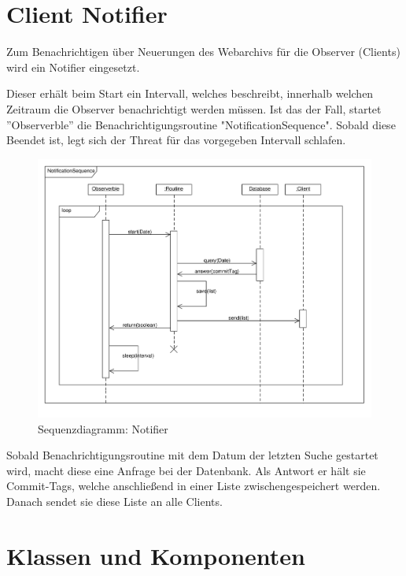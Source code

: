 \section {Client Notifier}
Zum Benachrichtigen über Neuerungen des Webarchivs für die Observer (Clients) wird ein Notifier eingesetzt.

Dieser erhält beim Start ein Intervall, welches beschreibt, innerhalb welchen Zeitraum die Observer  benachrichtigt werden müssen. Ist das der Fall, startet ''Observerble'' die Benachrichtigungsroutine  "NotificationSequence". Sobald diese Beendet ist, legt sich der Threat  für das vorgegeben Intervall schlafen.

\begin{figure}[H]
	\centering
	\includegraphics[width=\textwidth]{design/frontend/sequence/notifySequence.pdf}
	\caption{Sequenzdiagramm: Notifier}
\end{figure}

Sobald Benachrichtigungsroutine mit dem Datum der letzten Suche gestartet wird, macht diese eine Anfrage bei der Datenbank. Als Antwort er hält sie Commit-Tags, welche anschließend in einer Liste zwischengespeichert werden. Danach sendet sie diese Liste an alle Clients. 


\section{Klassen und Komponenten}

